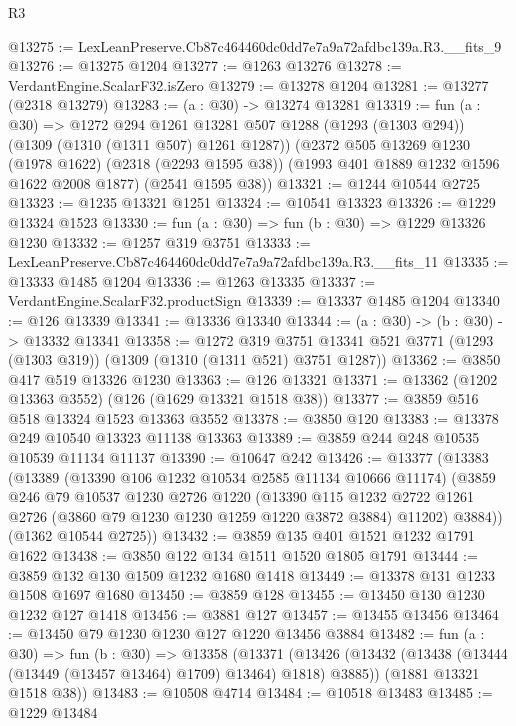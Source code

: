 \begin{lexlean}{R3}
\begin{coremodule}
@13275 := LexLeanPreserve.Cb87c464460dc0dd7e7a9a72afdbc139a.R3.__fits_9
@13276 := @13275 @1204
@13277 := @1263 @13276
@13278 := VerdantEngine.ScalarF32.isZero
@13279 := @13278 @1204
@13281 := @13277 (@2318 @13279)
@13283 := (a : @30) -> @13274 @13281
@13319 := fun (a : @30) =>
  @1272
    @294
    @1261
    @13281
    @507
    @1288
    (@1293 (@1303 @294))
    (@1309 (@1310 (@1311 @507) @1261 @1287))
    (@2372
      @505
      @13269
      @1230
      (@1978 @1622)
      (@2318 (@2293 @1595 @38))
      (@1993 @401 @1889 @1232 @1596 @1622 @2008 @1877)
      (@2541 @1595 @38))
@13321 := @1244 @10544 @2725
@13323 := @1235 @13321 @1251
@13324 := @10541 @13323
@13326 := @1229 @13324 @1523
@13330 := fun (a : @30) => fun (b : @30) => @1229 @13326 @1230
@13332 := @1257 @319 @3751
@13333 := LexLeanPreserve.Cb87c464460dc0dd7e7a9a72afdbc139a.R3.__fits_11
@13335 := @13333 @1485 @1204
@13336 := @1263 @13335
@13337 := VerdantEngine.ScalarF32.productSign
@13339 := @13337 @1485 @1204
@13340 := @126 @13339
@13341 := @13336 @13340
@13344 := (a : @30) -> (b : @30) -> @13332 @13341
@13358 := @1272
    @319
    @3751
    @13341
    @521
    @3771
    (@1293 (@1303 @319))
    (@1309 (@1310 (@1311 @521) @3751 @1287))
@13362 := @3850 @417 @519 @13326 @1230
@13363 := @126 @13321
@13371 := @13362 (@1202 @13363 @3552) (@126 (@1629 @13321 @1518 @38))
@13377 := @3859 @516 @518 @13324 @1523 @13363 @3552
@13378 := @3850 @120
@13383 := @13378 @249 @10540 @13323 @11138 @13363
@13389 := @3859 @244 @248 @10535 @10539 @11134 @11137
@13390 := @10647 @242
@13426 := @13377
    (@13383
      (@13389
        (@13390 @106 @1232 @10534 @2585 @11134 @10666 @11174)
        (@3859
          @246
          @79
          @10537
          @1230
          @2726
          @1220
          (@13390
            @115
            @1232
            @2722
            @1261
            @2726
            (@3860 @79 @1230 @1230 @1259 @1220 @3872 @3884)
            @11202)
          @3884))
      (@1362 @10544 @2725))
@13432 := @3859 @135 @401 @1521 @1232 @1791 @1622
@13438 := @3850 @122 @134 @1511 @1520 @1805 @1791
@13444 := @3859 @132 @130 @1509 @1232 @1680 @1418
@13449 := @13378 @131 @1233 @1508 @1697 @1680
@13450 := @3859 @128
@13455 := @13450 @130 @1230 @1232 @127 @1418
@13456 := @3881 @127
@13457 := @13455 @13456
@13464 := @13450 @79 @1230 @1230 @127 @1220 @13456 @3884
@13482 := fun (a : @30) =>
  fun (b : @30) =>
  @13358
    (@13371
      (@13426 (@13432 (@13438 (@13444 (@13449 (@13457 @13464) @1709) @13464) @1818) @3885))
      (@1881 @13321 @1518 @38))
@13483 := @10508 @4714
@13484 := @10518 @13483
@13485 := @1229 @13484

\end{coremodule}
\end{lexlean}
